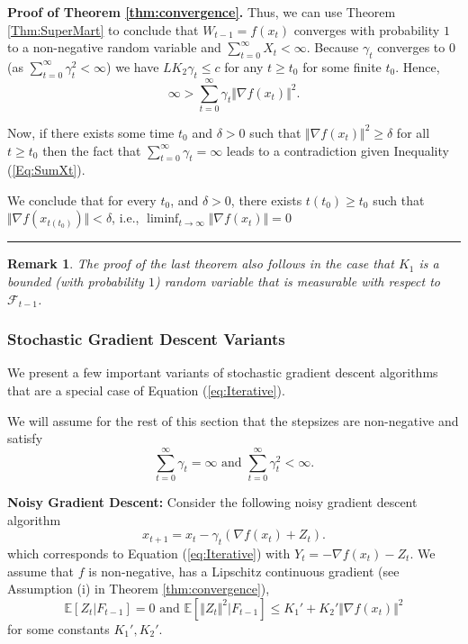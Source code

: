 \documentclass[letter,11pt]{article}
\newtheorem{remark}{Remark}[section]
\newenvironment {proof}[1][Proof]{\noindent \textbf {#1.} }{\ \rule {0.5em}{0.5em}}
\begin{document}
\begin{proof}[Proof of Theorem \ref{thm:convergence}]
Thus, we can use Theorem \ref{Thm:SuperMart} to conclude that $W_{t-1}=f(x_{t})$ converges with probability $1$ to a non-negative random variable and $\sum_{t=0}^{\infty} X_{t} < \infty $. 
Because $\gamma_{t}$ converges to $0$ (as $\sum _{t=0} ^{\infty} \gamma_{t}^{2} < \infty $) we have $LK_{2} \gamma_{t} \leq c$ for any $t \geq t_{0}$ for some finite $t_{0}$. Hence, 
\begin{equation} \label{Eq:SumXt}
    \infty > \sum _{t=0}^{\infty}  \gamma_{t} \Vert \nabla f(x_{t}) \Vert ^{2}.  
    \end{equation} 

Now, if there exists some time $t_{0}$ and $\delta > 0$ such that $\Vert \nabla f(x_{t}) \Vert ^{2} \geq \delta $ for all $t \geq t_{0}$ then the fact that $\sum _{t=0}^{\infty} \gamma_{t} = \infty$ leads to a contradiction given Inequality (\ref{Eq:SumXt}). 

We conclude that for every $t_{0}$, and $\delta > 0$, there exists $t(t_{0}) \geq t_{0} $ such that $\Vert \nabla f(x_{t(t_{0})}) \Vert  < \delta $, i.e., $\liminf _{t \rightarrow \infty} \Vert \nabla f(x_{t}) \Vert =0  $ 
\end{proof}

\begin{remark}
    The proof of the last theorem also follows in the case that $K_{1}$ is a bounded (with probability $1$) random variable that is measurable with respect to $\mathcal{F}_{t-1}$. 
\end{remark}

\subsubsection{Stochastic Gradient Descent Variants} \label{Sec:SGD}



We present a few important variants of stochastic gradient descent algorithms that are a special case of Equation (\ref{eq:Iterative}). 

We will assume for the rest of this section that the stepsizes are non-negative and satisfy 
$$ \sum_{t=0}^{\infty} \gamma_{t} = \infty \text{ and }  \sum _{t=0}^{\infty} \gamma_{t}^{2} < \infty.$$

\textbf{Noisy Gradient Descent:} Consider the following noisy gradient descent algorithm 
\begin{equation} \label{Eq:NoisyGrad}
    x_{t+1} = x_{t} - \gamma_{t} ( \nabla f(x_{t}) + Z_{t}). 
\end{equation}
which corresponds to Equation (\ref{eq:Iterative}) with $Y_{t} = - \nabla f(x_{t}) - Z_{t}$. 
We assume that $f$ is non-negative, has a Lipschitz continuous gradient (see Assumption (i) in Theorem \ref{thm:convergence}), 
$$\mathbb{E} [Z_{t} | F_{t-1} ] = 0 \text { and } \mathbb{E} [ \Vert Z_{t}  \Vert ^{2}| F_{t-1} ] \leq K_{1}' + K_{2}' \Vert \nabla f(x_{t})  \Vert ^{2}$$
for some constants $K_{1}', K_{2}'$. 
\end{document}
